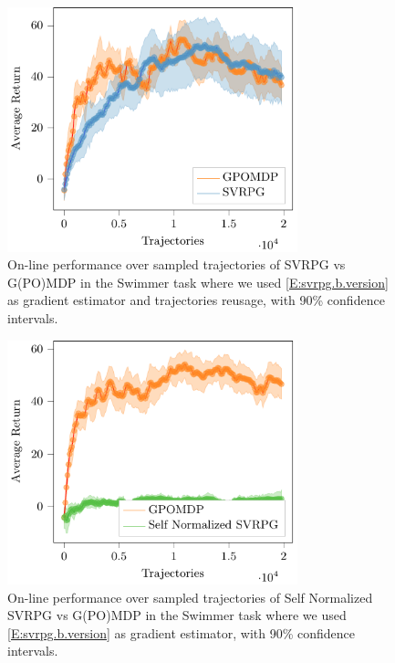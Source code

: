 \begin{figure}[h]
	\begin{minipage}[h]{1\textwidth}
		\centering
		\includegraphics[width=0.75\textwidth]{Images/Experiments/swimmer_GPOMDP_vs_SVRPG_B_reuse.pdf}
		\vspace{-0.1in}
		\caption{On-line performance over sampled trajectories of \acs{SVRPG} vs G(PO)MDP in the Swimmer task where we used \ref{E:svrpg.b.version} as gradient estimator and trajectories reusage, with 90\% confidence intervals.}
		\label{fig:swimmersix}
	\end{minipage}
	\vspace{-0.15in}
\end{figure}


\begin{figure}[h]
	\begin{minipage}[h]{1\textwidth}
		\centering
		\includegraphics[width=0.75\textwidth]{Images/Experiments/swimmer_Self_SVRPG_vs_GPOMDP_B.pdf}
		\vspace{-0.1in}
		\caption{On-line performance over sampled trajectories of Self Normalized \acs{SVRPG} vs G(PO)MDP in the Swimmer task where we used \ref{E:svrpg.b.version} as gradient estimator, with 90\% confidence intervals.}
		\label{fig:swimmerthree}
	\end{minipage}
	\vspace{-0.15in}
\end{figure}

